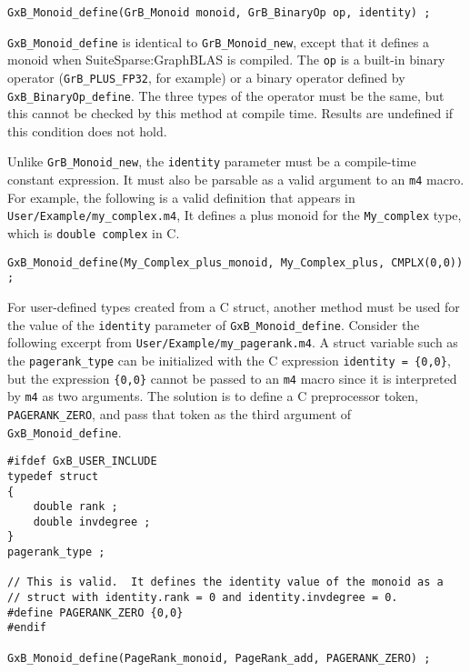 \documentclass[12pt]{article}
\begin{document}
\begin{mdframed}[userdefinedwidth=6in]
{\footnotesize
\begin{verbatim}
GxB_Monoid_define(GrB_Monoid monoid, GrB_BinaryOp op, identity) ;
\end{verbatim} } \end{mdframed}

    \verb'GxB_Monoid_define' is identical to \verb'GrB_Monoid_new', except that
    it defines a monoid when SuiteSparse:GraphBLAS is compiled.  The \verb'op'
    is a built-in binary operator (\verb'GrB_PLUS_FP32', for example) or a
    binary operator defined by \verb'GxB_BinaryOp_define'.  The three types of
    the operator must be the same, but this cannot be checked by this method at
    compile time.  Results are undefined if this condition does not hold.

    Unlike \verb'GrB_Monoid_new', the \verb'identity' parameter must be a
    compile-time constant expression.  It must also be parsable as a valid
    argument to an \verb'm4' macro.  For example, the following is a valid
    definition that appears in \verb'User/Example/my_complex.m4',  It defines a
    plus monoid for the \verb'My_complex' type, which is \verb'double complex'
    in C.

{\footnotesize
\begin{verbatim}
GxB_Monoid_define(My_Complex_plus_monoid, My_Complex_plus, CMPLX(0,0)) ; \end{verbatim}}

For user-defined types created from a C struct, another method must be used
for the value of the \verb'identity' parameter of \verb'GxB_Monoid_define'.
Consider the following excerpt from \verb'User/Example/my_pagerank.m4'.  A
struct variable such as the \verb'pagerank_type' can be initialized with the C
expression \verb'identity = {0,0}', but the expression \verb'{0,0}' cannot be
passed to an \verb'm4' macro since it is interpreted by \verb'm4' as two
arguments.  The solution is to define a C preprocessor token,
\verb'PAGERANK_ZERO', and pass that token as the third argument of
\verb'GxB_Monoid_define'.

{\footnotesize
\begin{verbatim}
#ifdef GxB_USER_INCLUDE
typedef struct
{
    double rank ;
    double invdegree ;
}
pagerank_type ;

// This is valid.  It defines the identity value of the monoid as a
// struct with identity.rank = 0 and identity.invdegree = 0.
#define PAGERANK_ZERO {0,0}
#endif

GxB_Monoid_define(PageRank_monoid, PageRank_add, PAGERANK_ZERO) ;
\end{verbatim} }
\end{document}
